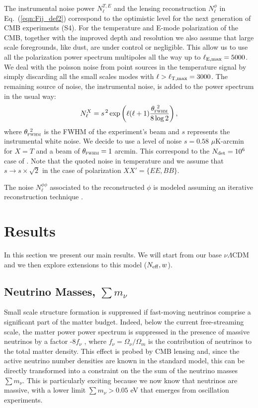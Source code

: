 \documentclass[aps,prd,reprint,superscriptaddress]{revtex4-1}
\newcommand\refeq[1]{Eq.~(\ref{eqn:#1})}
\begin{document}
The instrumental noise power $N_{\ell}^{T,E}$ and the lensing reconstruction $N_{\ell}^{\phi}$ in \refeq{Fij_def2} correspond to the optimistic level for the next generation of CMB experiments (S4).
For the temperature and E-mode polarization of the CMB, together with the improved depth and resolution we also assume that large scale foregrounds, like dust, are under control or negligible. This allow us to use all the polarization power spectrum multipoles all the way up to $\ell_{\rm E,max}=5000$. We deal with the poisson noise from point sources in the temperature signal by simply discarding all the small scales modes with $\ell>\ell_{\rm T,max}=3000$.
The remaining source of noise, the instrumental noise, is added to the power spectrum in the usual way:
 \begin{equation}
 	\centering
		N^{X}_\ell = s^{\, 2} \exp \left(\ell(\ell+1) \frac{\theta^{\ 2}_{\textsc{fwhm}}}{8\log2}\right),
	\label{eq:beamnoise}
\end{equation}
where $\theta^{\ 2}_{\textsc{fwhm}}$ is the FWHM of the experiment's beam and $s$ represents the instrumental white noise.
We decide to use a level of noise $s = 0.58$ $\mu$K-arcmin for $X=T$ and a beam of $\theta_{\textsc{fwhm}}=1$ arcmin. This correspond to the $N_{\rm det}=10^{6}$ case of \cite{wu:2014}. 
Note that the quoted noise in temperature and we assume that $s \rightarrow s\times \sqrt{2}$ in the case of polarization $ XX' = \{ EE, BB \}$.


The noise $N_\ell^{\phi\phi}$ associated to the reconstructed $\phi$ is modeled assuming an iterative reconstruction technique \cite{seljak:2004}. 


\section{Results \label{sec:results}}
In this section we present our main results. We will start from our base $\nu \Lambda$CDM and we then explore extensions to this model ($N_{\rm eff},w$).

\subsection{Neutrino Masses, $\sum m_\nu$}



Small scale structure formation is suppressed if fast-moving neutrinos comprise a significant part of the matter budget. 
Indeed, below the current free-streaming scale, the matter power power spectrum is suppressed in the presence of
massive neutrinos by a factor -8$f_{\nu}$ , where $f_{\nu} = \Omega_{\nu} / \Omega_{m}$ is the contribution of neutrinos to the total matter density.
This effect is probed by CMB lensing and, since the active neutrino number densities are known in the standard model, this can be directly transformed into a constraint on the the sum of the neutrino masses $\sum m_\nu$. This is particularly exciting because we now know that neutrinos are massive, with a lower limit  $\sum m_\nu>0.05$ eV that emerges from oscillation experiments. 
\end{document}
